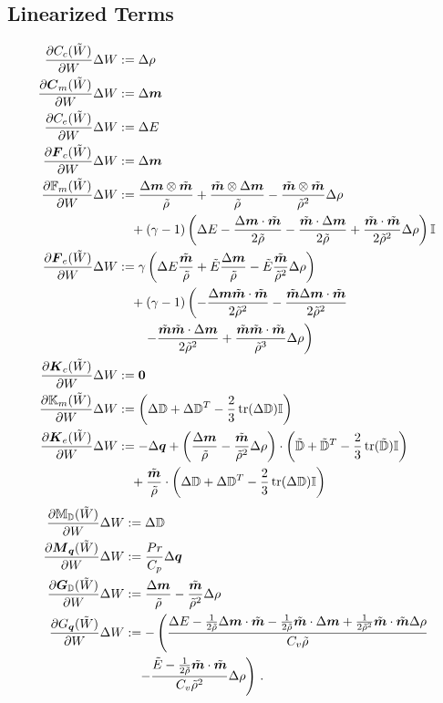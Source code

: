 \documentclass[Dissertation.tex]{subfiles}
\begin{document}
\subsection{Linearized Terms}
\begin{align*}
\frac{\partial C_c(\tilde W)}{\partial W}\Delta W&:=
	\Delta\rho\\
\frac{\partial\boldsymbol C_m(\tilde W)}{\partial W}\Delta W&:=
	\Delta\boldsymbol m\\
\frac{\partial C_e(\tilde W)}{\partial W}\Delta W&:=
	\Delta E\\
\frac{\partial\boldsymbol F_c(\tilde W)}{\partial W}\Delta W&:=
	\Delta\boldsymbol m\\
\frac{\partial\mathbb{F}_m(\tilde W)}{\partial W}\Delta W&:=
	\frac{\Delta\boldsymbol m\otimes\tilde{\boldsymbol m}}{\tilde\rho}
	+\frac{\tilde{\boldsymbol m}\otimes\Delta\boldsymbol m}{\tilde\rho}
	-\frac{\tilde{\boldsymbol m}\otimes\tilde{\boldsymbol m}}{\tilde\rho^2}\Delta\rho
	\\&\quad
	+(\gamma-1)\left( \Delta E
	-\frac{\Delta\boldsymbol m\cdot\tilde{\boldsymbol m}}{2\tilde\rho}
	-\frac{\tilde{\boldsymbol m}\cdot\Delta\boldsymbol m}{2\tilde\rho}
	+\frac{\tilde{\boldsymbol m}\cdot\tilde{\boldsymbol m}}{2\tilde\rho^2}\Delta\rho
	 \right)\mathbb{I}\\
\frac{\partial\boldsymbol F_e(\tilde W)}{\partial W}\Delta W&:=
	\gamma\left( 
	\Delta E\frac{\tilde{\boldsymbol m}}{\tilde\rho}
	+\tilde E\frac{\Delta\boldsymbol m}{\tilde\rho}
	-\tilde E\frac{\tilde{\boldsymbol m}}{\tilde\rho^2}\Delta\rho \right)
	\\&\quad
	+(\gamma-1)\left(
	-\frac{\Delta\boldsymbol m\tilde{\boldsymbol m}\cdot\tilde{\boldsymbol m}}{2\tilde\rho^2}
	-\frac{\tilde{\boldsymbol m}\Delta\boldsymbol m\cdot\tilde{\boldsymbol m}}{2\tilde\rho^2}
	\right.\\&\quad\quad\left.
	-\frac{\tilde{\boldsymbol m}\tilde{\boldsymbol m}\cdot\Delta\boldsymbol m}{2\tilde\rho^2}
	+\frac{\tilde{\boldsymbol m}\tilde{\boldsymbol m}\cdot\tilde{\boldsymbol m}}{\tilde\rho^3}\Delta\rho\right)\\
\frac{\partial\boldsymbol K_c(\tilde W)}{\partial W}\Delta W&:=
	\boldsymbol 0\\
\frac{\partial\mathbb{K}_m(\tilde W)}{\partial W}\Delta W&:=
	\left( \Delta\mathbb{D}+\Delta\mathbb{D}^T-\frac{2}{3}\operatorname*{tr}(\Delta\mathbb{D})\mathbb{I} \right)\\
\frac{\partial\boldsymbol K_e(\tilde W)}{\partial W}\Delta W&:=
	-\Delta\boldsymbol q+\left( \frac{\Delta\boldsymbol m}{\tilde\rho}-\frac{\tilde{\boldsymbol m}}{\tilde\rho^2}\Delta\rho \right)
	\cdot\left( \tilde{\mathbb{D}}+\tilde{\mathbb{D}}^T-\frac{2}{3}\operatorname*{tr}(\tilde{\mathbb{D}})\mathbb{I} \right)
	\\&\quad
	+\frac{\tilde{\boldsymbol m}}{\tilde\rho}\cdot\left( \Delta\mathbb{D}+\Delta\mathbb{D}^T-\frac{2}{3}\operatorname*{tr}(\Delta\mathbb{D})\mathbb{I} \right)\\
\end{align*}
\begin{align*}
\frac{\partial\mathbb{M}_{\mathbb{D}}(\tilde W)}{\partial W}\Delta W&:=
	\Delta\mathbb{D}\\
\frac{\partial\boldsymbol M_{\boldsymbol q}(\tilde W)}{\partial W}\Delta W&:=
	\frac{Pr}{C_p}\Delta\boldsymbol q\\
\frac{\partial\boldsymbol G_{\mathbb{D}}(\tilde W)}{\partial W}\Delta W&:=
	\frac{\Delta\boldsymbol m}{\tilde\rho}-\frac{\tilde{\boldsymbol m}}{\tilde\rho^2}\Delta\rho\\
\frac{\partial G_{\boldsymbol q}(\tilde W)}{\partial W}\Delta W&:=
	-\left(\frac{\Delta E-\frac{1}{2\tilde\rho}\Delta\boldsymbol m\cdot\tilde{\boldsymbol m}
	-\frac{1}{2\tilde\rho}\tilde{\boldsymbol m}\cdot\Delta\boldsymbol m
	+\frac{1}{2\tilde\rho^2}\tilde{\boldsymbol m}\cdot\tilde{\boldsymbol m}\Delta\rho}{C_v\tilde\rho}
	\right.\\&\quad\left.
	-\frac{\tilde E-\frac{1}{2\tilde\rho}\tilde{\boldsymbol m}\cdot\tilde{\boldsymbol m}}{C_v\tilde\rho^2}\Delta\rho\right)
\,.
\end{align*}
\end{document}
